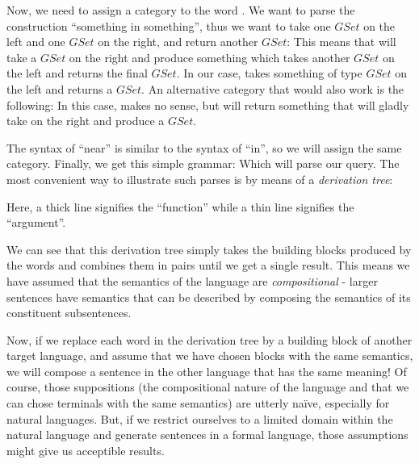 \documentclass[main.tex]{subfiles}
\begin{document}
Now, we need to assign a category to the word . We want to parse
the construction ``something in something'', thus we want to take one $GSet$
on the left and one $GSet$ on the right, and return another $GSet$:
This means that  will take a $GSet$ on the right and produce something
which takes another $GSet$ on the left and returns the final $GSet$.
In our case,  takes something of type $GSet$ on the left and
returns a $GSet$.
An alternative category that would also work is the following:
In this case,  makes no sense, but 
will return something that will gladly take  on the right and
produce a $GSet$.

The syntax of ``near'' is similar to the syntax of ``in'', so we will assign
the same category. Finally, we get this simple grammar:
Which will parse our query. The most convenient way to illustrate such parses
is by means of a \emph{derivation tree}:

Here, a thick line signifies the ``function'' while a thin line signifies the
``argument''.

We can see that this derivation tree simply takes the building blocks produced
by the words and combines them in pairs until we get a single result. This means
we have assumed that the semantics of the language are \emph{compositional} -
larger sentences have semantics that can be described by composing the semantics
of its constituent subsentences.

Now, if we replace each word in the derivation tree by a building block of another
target language, and assume that we have chosen blocks with the same semantics,
we will compose a sentence in the other language that has the same meaning!
Of course, those suppositions (the compositional nature of the language and
that we can chose terminals with the same semantics) are utterly naïve,
especially for natural languages. But, if we restrict ourselves to a limited
domain within the natural language and generate sentences in a formal language,
those assumptions might give us acceptible results.
\end{document}
